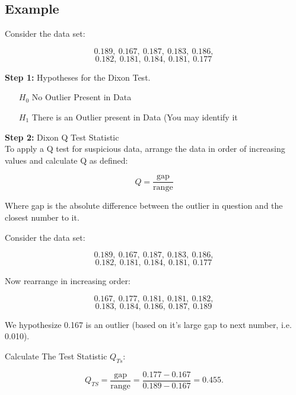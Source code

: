 \documentclass[a4paper,12pt]{article}
\begin{document}
	
	
	\newpage
	
	
	
	
	\subsection*{Example}
	Consider the data set:
	\begin{framed}
		\[0.189,\ 0.167,\ 0.187,\ 0.183,\ 0.186,\]\[ 0.182,\ 0.181,\ 0.184,\ 0.181,\ 0.177 \,\]
	\end{framed}
	
	
	
	\noindent \textbf{Step 1:} Hypotheses for the Dixon Test.
	
	\begin{framed}
		\begin{itemize}
			\item[$H_0$] No Outlier Present in Data
			\item[$H_1$] There is an Outlier present in Data (You may identify it
		\end{itemize}
	\end{framed}
	
	
	
	\noindent \textbf{Step 2:} Dixon Q Test Statistic\\ \smallskip
	To apply a Q test for suspicious data, arrange the data in order of increasing values and calculate Q as defined:
	\begin{framed}
		\[ Q = \frac{\text{gap}}{\text{range}} \]
	\end{framed}
	\noindent Where gap is the absolute difference between the outlier in question and the closest number to it. 
	
	
	\medskip
	\noindent Consider the data set:
	\begin{framed}
		\[0.189,\ 0.167,\ 0.187,\ 0.183,\ 0.186,\]\[ 0.182,\ 0.181,\ 0.184,\ 0.181,\ 0.177 \,\]
	\end{framed}
	\noindent Now rearrange in increasing order:
	\begin{framed}
		\[0.167,\ 0.177,\ 0.181,\ 0.181,\ 0.182,\]\[ 0.183,\ 0.184,\ 0.186,\ 0.187,\ 0.189 \, \]
	\end{framed}
	
	
	\noindent We hypothesize 0.167 is an outlier (based on it's large gap to next number, i.e. 0.010). 
	\begin{framed}
		\noindent Calculate The Test Statistic $Q_{Ts}$:
		{
			
			\[ Q_{TS}=\frac{\text{gap}}{\text{range}} = \frac{0.177-0.167}{0.189-0.167}=0.455.\]
		}
	\end{framed}
	
\end{document}
